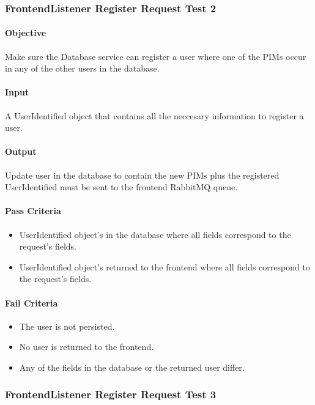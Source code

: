 \documentclass[hidelinks,english]{article}
\begin{document}
			\subsubsection{FrontendListener Register Request Test 2}\label{databasebusinesslistenerregistertest2}
				\paragraph{Objective} Make sure the Database service can register a user where one of the PIMs occur in any of the other users in the database.
				\paragraph{Input} A UserIdentified object that contains all the neccesary information to register a user.
				\paragraph{Output} Update user in the database to contain the new PIMs plus the registered UserIdentified must be sent to the frontend RabbitMQ queue.
				\paragraph{Pass Criteria}
				\begin{itemize}
					\item UserIdentified object's in the database where all fields correspond to the request's fields.
					\item UserIdentified object's returned to the frontend where all fields correspond to the request's fields.
				\end{itemize}
				\paragraph{Fail Criteria}
				\begin{itemize}
					\item The user is not persisted.
					\item No user is returned to the frontend.
					\item Any of the fields in the database or the returned user differ.
				\end{itemize}
				
			\subsubsection{FrontendListener Register Request Test 3}\label{databasebusinesslistenerregistertest3}
\end{document}
